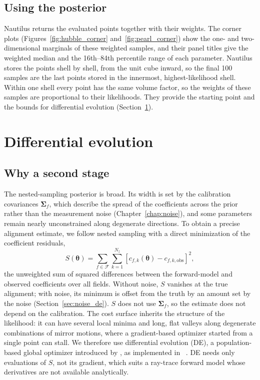 \subsection{Using the posterior}
Nautilus returns the evaluated points together with their weights. The corner plots (Figures~\ref{fig:hubble_corner} and~\ref{fig:pearl_corner}) show the one- and two-dimensional marginals of these weighted samples, and their panel titles give the weighted median and the 16th--84th percentile range of each parameter. Nautilus stores the points shell by shell, from the unit cube inward, so the final 100 samples are the last points stored in the innermost, highest-likelihood shell. Within one shell every point has the same volume factor, so the weights of these samples are proportional to their likelihoods. They provide the starting point and the bounds for differential evolution (Section~\ref{sec:de}).

\section{Differential evolution}\label{sec:de}

\subsection{Why a second stage}
The nested-sampling posterior is broad. Its width is set by the calibration covariances $\boldsymbol{\Sigma}_f$, which describe the spread of the coefficients across the prior rather than the measurement noise (Chapter~\ref{chap:noise}), and some parameters remain nearly unconstrained along degenerate directions. To obtain a precise alignment estimate, we follow nested sampling with a direct minimization of the coefficient residuals,
\begin{equation}
S(\boldsymbol{\theta}) = \sum_{f\in\mathcal{F}}\sum_{k=1}^{N_z}\left[c_{f,k}(\boldsymbol{\theta}) - c_{f,k,\mathrm{obs}}\right]^2,
\label{eq:de_cost}
\end{equation}
the unweighted sum of squared differences between the forward-model and observed coefficients over all fields. Without noise, $S$ vanishes at the true alignment; with noise, its minimum is offset from the truth by an amount set by the noise (Section~\ref{sec:noise_de}). $S$ does not use $\boldsymbol{\Sigma}_f$, so the estimate does not depend on the calibration. The cost surface inherits the structure of the likelihood: it can have several local minima and long, flat valleys along degenerate combinations of mirror motions, where a gradient-based optimizer started from a single point can stall. We therefore use differential evolution (DE), a population-based global optimizer introduced by \citet{StornPrice1997}, as implemented in ~\citep{Virtanen2020}. DE needs only evaluations of $S$, not its gradient, which suits a ray-trace forward model whose derivatives are not available analytically.

